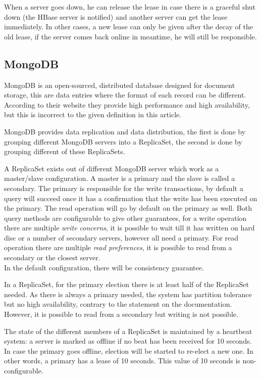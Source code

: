 \documentclass[final,5p,times]{elsarticle}
\begin{document}
When a server goes down, he can release the lease in case there is a graceful shut down (the HBase server is notified) and another server can get the lease immediately. In other cases, a new lease can only be given after the decay of the old lease, if the server comes back online in meantime, he will still be responsible. 

\subsection{MongoDB}
MongoDB\cite{mongodb-doc} is an open-sourced, distributed database designed for document storage, this are data entries where the format of each record can be different. According to their website they provide high performance and high availability, but this is incorrect to the given definition in this article. 

MongoDB provides data replication and data distribution, the first is done by grouping different MongoDB servers into a ReplicaSet, the second is done by grouping different of these ReplicaSets. 

A ReplicaSet exists out of different MongoDB server which work as a master/slave configuration. A master is a primary and the slave is called a secondary. The primary is responsible for the write transactions, by default a query will succeed once it has a confirmation that the write has been executed on the primary. The read operation will go by default on the primary as well. Both query methods are configurable to give other guarantees, for a write operation there are multiple \textit{write concerns}, it is possible to wait till it has written on hard disc or a number of secondary servers, however all need a primary. For read operation there are multiple \textit{read preferences}, it is possible to read from a secondary or the closest server. \\ 
In the default configuration, there will be consistency guarantee.

In a ReplicaSet, for the primary election there is at least half of the ReplicaSet needed. As there is always a primary needed, the system has partition tolerance but no high availability, contrary to the statement on the documentation. However, it is possible to read from a secondary but writing is not possible.

The state of the different members of a ReplicaSet is maintained by a heartbeat system: a server is marked as offline if no beat has been received for 10 seconds. In case the primary goes offline, election will be started to re-elect a new one. In other words, a primary has a lease of 10 seconds. This value of 10 seconds is non-configurable. 
\end{document}
